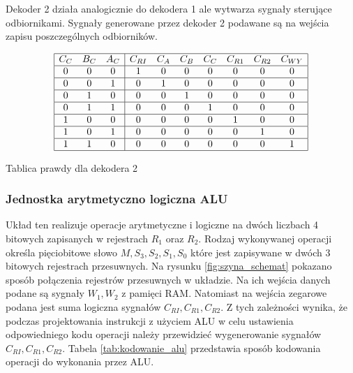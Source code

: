 \documentclass[../main.tex]{subfiles}
\begin{document}
        Dekoder 2 działa analogicznie do dekodera 1 ale wytwarza sygnały sterujące odbiornikami. Sygnały generowane przez dekoder 2 podawane
        są na wejścia zapisu poszczególnych odbiorników.

        \begin{table}[ht]
            \centering
            \[
            \begin{array}{|ccc|ccccccc|}
            \hline
            C_C & B_C & A_C & C_{RI} & C_A & C_B & C_C & C_{R1} & C_{R2} & C_{WY} \\ \hline
            0   & 0   & 0   & 1      & 0   & 0   & 0   & 0      & 0      & 0      \\ \hline
            0   & 0   & 1   & 0      & 1   & 0   & 0   & 0      & 0      & 0      \\ \hline
            0   & 1   & 0   & 0      & 0   & 1   & 0   & 0      & 0      & 0      \\ \hline
            0   & 1   & 1   & 0      & 0   & 0   & 1   & 0      & 0      & 0      \\ \hline
            1   & 0   & 0   & 0      & 0   & 0   & 0   & 1      & 0      & 0      \\ \hline
            1   & 0   & 1   & 0      & 0   & 0   & 0   & 0      & 1      & 0      \\ \hline
            1   & 1   & 0   & 0      & 0   & 0   & 0   & 0      & 0      & 1      \\ \hline
            \end{array}
            \]
            \caption{Tablica prawdy dla dekodera 2}
            \label{tab:odbiorniki}
        \end{table}

        \subsubsection*{Jednostka arytmetyczno logiczna ALU}
        
        Układ ten realizuje operacje arytmetyczne i logiczne na dwóch liczbach 4 bitowych zapisanych w rejestrach $R_1$ oraz $R_2$.
        Rodzaj wykonywanej operacji określa pięciobitowe słowo $M, S_3, S_2, S_1, S_0$ które jest zapisywane w dwóch 3 bitowych rejestrach przesuwnych.
        Na rysunku \ref{fig:szyna_schemat} pokazano sposób połączenia rejestrów przesuwnych w układzie. Na ich wejścia danych podane są 
        sygnały $W_1, W_2$ z pamięci RAM. Natomiast na wejścia zegarowe podana jest suma logiczna sygnałów $C_{RI}, C_{R1}, C_{R2}$. Z tych zależności
        wynika, że podczas projektowania instrukcji z użyciem ALU w celu ustawienia odpowiedniego kodu operacji należy przewidzieć 
        wygenerowanie sygnałów $C_{RI}, C_{R1}, C_{R2}$. Tabela \ref{tab:kodowanie_alu} przedstawia sposób kodowania operacji do wykonania przez ALU.
\end{document}
